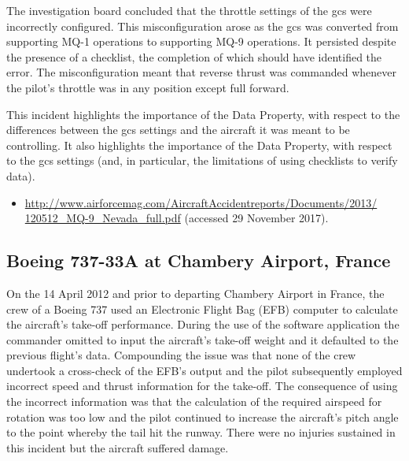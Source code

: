 The investigation board concluded that the throttle settings of the \gls{gcs} were incorrectly configured. This misconfiguration arose as the \gls{gcs} was converted from supporting MQ-1 operations to supporting MQ-9 operations. It persisted despite the presence of a checklist, the completion of which should have identified the error. The misconfiguration meant that reverse thrust was commanded whenever the pilot's throttle was in any position except full forward.

This incident highlights the importance of the  Data Property, with respect to the differences between the \gls{gcs} settings and the aircraft it was meant to be controlling. It also highlights the importance of the  Data Property, with respect to the \gls{gcs} settings (and, in particular, the limitations of using checklists to verify data).

\begin{samepage}
\begin{itemize}
	\item \raggedright{\href{http://www.airforcemag.com/AircraftAccidentreports/Documents/2013/120512_MQ-9_Nevada_full.pdf}{http://www.airforcemag.com/AircraftAccidentreports/Documents/2013/ 120512\_MQ-9\_Nevada\_full.pdf} (accessed 29 November 2017).}
\end{itemize}
\end{samepage}


\subsection{Boeing 737-33A at Chambery Airport, France} \label{bkm:incacc:737-33A} 
On the 14 April 2012 and prior to departing Chambery Airport in France, the crew of a Boeing 737 used an Electronic Flight Bag (EFB) computer to calculate the aircraft’s take-off performance. During the use of the software application the commander omitted to input the aircraft’s take-off weight and it defaulted to the previous flight’s data. Compounding the issue was that none of the crew undertook a cross-check of the EFB’s output and the pilot subsequently employed incorrect speed and thrust \gls{information} for the take-off. The consequence of using the incorrect \gls{information} was that the calculation of the required airspeed for rotation was too low and the pilot continued to increase the aircraft’s pitch angle to the point whereby the tail hit the runway. There were no injuries sustained in this incident but the aircraft suffered damage.

